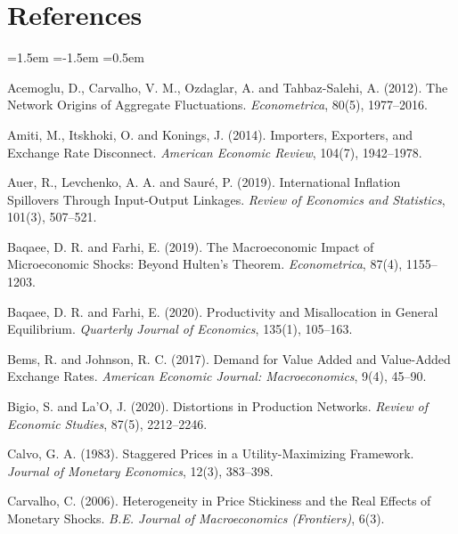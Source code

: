 \documentclass[12pt]{article}
\begin{document}
\section*{References}

\begin{list}{}{\leftmargin=1.5em \itemindent=-1.5em \itemsep=0.5em}

\item Acemoglu, D., Carvalho, V. M., Ozdaglar, A. and Tahbaz-Salehi, A. (2012). The Network Origins of
Aggregate Fluctuations. \textit{Econometrica}, 80(5), 1977--2016.

\item Amiti, M., Itskhoki, O. and Konings, J. (2014). Importers, Exporters, and Exchange Rate
Disconnect. \textit{American Economic Review}, 104(7), 1942--1978.

\item Auer, R., Levchenko, A. A. and Sauré, P. (2019). International Inflation Spillovers Through
Input-Output Linkages. \textit{Review of Economics and Statistics}, 101(3), 507--521.

\item Baqaee, D. R. and Farhi, E. (2019). The Macroeconomic Impact of Microeconomic Shocks: Beyond
Hulten's Theorem. \textit{Econometrica}, 87(4), 1155--1203.

\item Baqaee, D. R. and Farhi, E. (2020). Productivity and Misallocation in General Equilibrium.
\textit{Quarterly Journal of Economics}, 135(1), 105--163.

\item Bems, R. and Johnson, R. C. (2017). Demand for Value Added and Value-Added Exchange Rates.
\textit{American Economic Journal: Macroeconomics}, 9(4), 45--90.

\item Bigio, S. and La'O, J. (2020). Distortions in Production Networks. \textit{Review of Economic
Studies}, 87(5), 2212--2246.

\item Calvo, G. A. (1983). Staggered Prices in a Utility-Maximizing Framework. \textit{Journal of
Monetary Economics}, 12(3), 383--398.

\item Carvalho, C. (2006). Heterogeneity in Price Stickiness and the Real Effects of Monetary Shocks.
\textit{B.E. Journal of Macroeconomics (Frontiers)}, 6(3).


\end{list}
\end{document}
